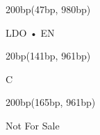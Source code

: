 \documentclass{article}
\begin{document}
  \begin{textblock*}{200bp}(47bp, 980bp)
  \begin{flushleft}
  \fontsize{17pt}{20pt}
  \gotham
  \color{offwhite}
  \selectfont
  LDO • EN\strut
  \end{flushleft}
  \end{textblock*}
  
  \begin{textblock*}{20bp}(141bp, 961bp)
  \begin{flushleft}
  \fontsize{17pt}{20pt}
  \gotham
  \color{offwhite}
  \selectfont
  C\strut
  \end{flushleft}
  \end{textblock*}
  
  \begin{textblock*}{200bp}(165bp, 961bp)
  \begin{flushleft}
  \fontsize{17pt}{20pt}
  \gotham
  \color{offwhite}
  \selectfont
  Not For Sale\strut
  \end{flushleft}
  \end{textblock*}
  
\end{document}
